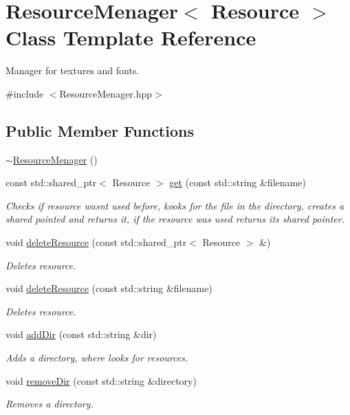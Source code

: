 \hypertarget{class_resource_menager}{}\section{Resource\+Menager$<$ Resource $>$ Class Template Reference}
\label{class_resource_menager}


Manager for textures and fonts.  




{\ttfamily \#include $<$Resource\+Menager.\+hpp$>$}

\subsection*{Public Member Functions}
\begin{DoxyCompactItemize}
\item 
\mbox{\hyperlink{class_resource_menager_af686b0f4b7f7167c88cac3586f4599c9}{$\sim$\+Resource\+Menager}} ()
\item 
const std\+::shared\+\_\+ptr$<$ Resource $>$ \mbox{\hyperlink{class_resource_menager_a1c75062d799f0baa37cfa4bbbc9a5779}{get}} (const std\+::string \&filename)
\begin{DoxyCompactList}\small\item\em Checks if resource wasn\textquotesingle{}t used before, kooks for the file in the directory, creates a shared pointed and returns it, if the resource was used returns it\textquotesingle{}s shared pointer. \end{DoxyCompactList}\item 
void \mbox{\hyperlink{class_resource_menager_a4b5dd5677fcb6e948c23f9925d6a6418}{delete\+Resource}} (const std\+::shared\+\_\+ptr$<$ Resource $>$ \&)
\begin{DoxyCompactList}\small\item\em Deletes resource. \end{DoxyCompactList}\item 
void \mbox{\hyperlink{class_resource_menager_a18a1e6c8e9ec427abefe13d44b84b2f2}{delete\+Resource}} (const std\+::string \&filename)
\begin{DoxyCompactList}\small\item\em Deletes resource. \end{DoxyCompactList}\item 
void \mbox{\hyperlink{class_resource_menager_a0d170bac7d943759d3ccc608b6db7761}{add\+Dir}} (const std\+::string \&dir)
\begin{DoxyCompactList}\small\item\em Adds a directory, where looks for resources. \end{DoxyCompactList}\item 
void \mbox{\hyperlink{class_resource_menager_a795728420523e598b095abded51019b4}{remove\+Dir}} (const std\+::string \&directory)
\begin{DoxyCompactList}\small\item\em Removes a directory. \end{DoxyCompactList}\end{DoxyCompactItemize}
